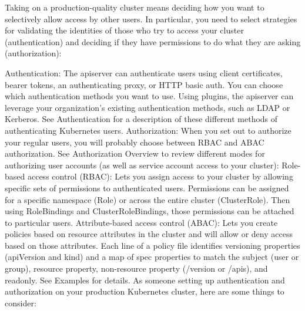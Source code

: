 Taking on a production-quality cluster means deciding how you want to selectively allow access by other users. In particular, you need to select strategies for validating the identities of those who try to access your cluster (authentication) and deciding if they have permissions to do what they are asking (authorization):

Authentication: The apiserver can authenticate users using client certificates, bearer tokens, an authenticating proxy, or HTTP basic auth. You can choose which authentication methods you want to use. Using plugins, the apiserver can leverage your organization’s existing authentication methods, such as LDAP or Kerberos. See Authentication for a description of these different methods of authenticating Kubernetes users.
Authorization: When you set out to authorize your regular users, you will probably choose between RBAC and ABAC authorization. See Authorization Overview to review different modes for authorizing user accounts (as well as service account access to your cluster):
Role-based access control (RBAC): Lets you assign access to your cluster by allowing specific sets of permissions to authenticated users. Permissions can be assigned for a specific namespace (Role) or across the entire cluster (ClusterRole). Then using RoleBindings and ClusterRoleBindings, those permissions can be attached to particular users.
Attribute-based access control (ABAC): Lets you create policies based on resource attributes in the cluster and will allow or deny access based on those attributes. Each line of a policy file identifies versioning properties (apiVersion and kind) and a map of spec properties to match the subject (user or group), resource property, non-resource property (/version or /apis), and readonly. See Examples for details.
As someone setting up authentication and authorization on your production Kubernetes cluster, here are some things to consider:

